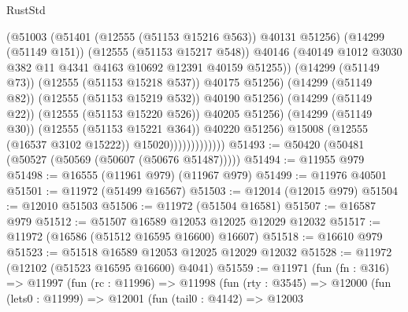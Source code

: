 \begin{lexlean}{RustStd}
\begin{coremodule}
                                      (@51003
                                        (@51401 (@12555 (@51153 @15216 @563)) @40131 @51256)
                                        (@14299 (@51149 @151))
                                        (@12555 (@51153 @15217 @548))
                                        @40146
                                        (@40149
                                          @1012
                                          @3030
                                          @382
                                          @11
                                          @4341
                                          @4163
                                          @10692
                                          @12391
                                          @40159
                                          @51255))
                                      (@14299 (@51149 @73))
                                      (@12555 (@51153 @15218 @537))
                                      @40175
                                      @51256)
                                    (@14299 (@51149 @82))
                                    (@12555 (@51153 @15219 @532))
                                    @40190
                                    @51256)
                                  (@14299 (@51149 @22))
                                  (@12555 (@51153 @15220 @526))
                                  @40205
                                  @51256)
                                (@14299 (@51149 @30))
                                (@12555 (@51153 @15221 @364))
                                @40220
                                @51256)
                              @15008
                              (@12555 (@16537 @3102 @15222))
                              @15020)))))))))))))
@51493 := @50420 (@50481 (@50527 (@50569 (@50607 (@50676 @51487)))))
@51494 := @11955 @979
@51498 := @16555 (@11961 @979) (@11967 @979)
@51499 := @11976 @40501
@51501 := @11972 (@51499 @16567)
@51503 := @12014 (@12015 @979)
@51504 := @12010 @51503
@51506 := @11972 (@51504 @16581)
@51507 := @16587 @979
@51512 := @51507 @16589 @12053 @12025 @12029 @12032
@51517 := @11972 (@16586 (@51512 @16595 @16600) @16607)
@51518 := @16610 @979
@51523 := @51518 @16589 @12053 @12025 @12029 @12032
@51528 := @11972 (@12102 (@51523 @16595 @16600) @4041)
@51559 := @11971
    (fun (fn : @316) =>
    @11997
      (fun (rc : @11996) =>
      @11998
        (fun (rty : @3545) =>
        @12000
          (fun (lets0 : @11999) =>
          @12001
            (fun (tail0 : @4142) =>
            @12003

\end{coremodule}
\end{lexlean}
